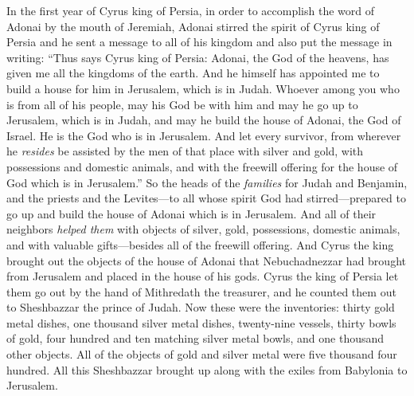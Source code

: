 
\begin{biblechapter} %
 In the first year of Cyrus king of Persia, in order to accomplish the word of Adonai by the mouth of Jeremiah, Adonai stirred the spirit of Cyrus king of Persia and he sent a message to all of his kingdom and also put the message in writing:
\verse “Thus says Cyrus king of Persia: Adonai, the God of the heavens, has given me all the kingdoms of the earth. And he himself has appointed me to build a house for him in Jerusalem, which is in Judah.
\verse Whoever among you who is from all of his people, may his God be with him and may he go up to Jerusalem, which is in Judah, and may he build the house of Adonai, the God of Israel. He is the God who is in Jerusalem.
\verse And let every survivor, from wherever he \textit{resides} be assisted by the men of that place with silver and gold, with possessions and domestic animals, and with the freewill offering for the house of God which is in Jerusalem.”
\verse So the heads of the \textit{families} for Judah and Benjamin, and the priests and the Levites—to all whose spirit God had stirred—prepared to go up and build the house of Adonai which is in Jerusalem.
\verse And all of their neighbors \textit{helped them} with objects of silver, gold, possessions, domestic animals, and with valuable gifts—besides all of the freewill offering.
\verse And Cyrus the king brought out the objects of the house of Adonai that Nebuchadnezzar had brought from Jerusalem and placed in the house of his gods.
\verse Cyrus the king of Persia let them go out by the hand of Mithredath the treasurer, and he counted them out to Sheshbazzar the prince of Judah.
\verse Now these were the inventories: thirty gold metal dishes, one thousand silver metal dishes, twenty-nine vessels,
\verse thirty bowls of gold, four hundred and ten matching silver metal bowls, and one thousand other objects.
\verse All of the objects of gold and silver metal were five thousand four hundred. All this Sheshbazzar brought up along with the exiles from Babylonia to Jerusalem.
\end{biblechapter}

